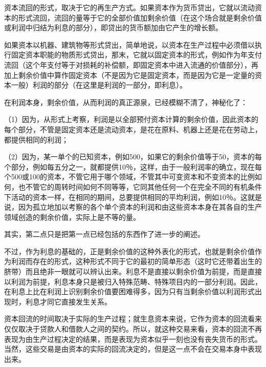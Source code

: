 资本流回的形式，取决于它的再生产方式。如果资本作为货币贷出，它就以流动资本的形式流回，流回的量等于它的全部价值加剩余价值（在这个场合就是剩余价值或利润中归结为利息的部分），即贷出的货币额加由它产生的增长额。

如果资本以机器、建筑物等形式贷出，简单地说，以资本在生产过程中必须借以执行固定资本职能的物质形式贷出，那末，它就以固定资本的形式，例如作为年支付流回（这个年支付等于对损耗的补偿额，即固定资本中进入流通的价值部分），再加上剩余价值中算作固定资本（不是因为它是固定资本，而是因为它是一定量的资本一般）利润的部分（在这里是利润的一部分，即利息）。

在利润本身，剩余价值，从而利润的真正源泉，已经模糊不清了，神秘化了：

（1）因为，从形式上考察，利润是以全部预付资本计算的剩余价值，因此资本的每个部分，不管是固定资本还是流动资本，是花在原料、机器上还是花在劳动上，都提供相同的利润；

（2）因为，某一单个的已知资本，例如500，如果它的剩余价值等于50，资本的每个部分，例如每五分之一，就都提供10％，这样，由于一般利润率的确立，现在每个500或100的资本，不管它用于哪个领域，不管其中可变资本和不变资本的比例如何，也不管它的周转时间如何不同等等，它同其他任何一个在完全不同的有机条件下活动的资本一样，在相同的期间，总要提供相同的平均利润，例如10％。这就是说，因为孤立地加以考察的各个单个资本的利润和由这些资本本身在其各自的生产领域创造的剩余价值，实际上是不等的量。

其实，第二点只是把第一点已经包括的东西作了进一步的阐述。

不过，作为利息的基础的，正是剩余价值的这种外表化的形式，也就是剩余价值作为利润而存在的形式，这种形式不同于它的最初的简单形态（这时它还带着出生的脐带）而且绝非一眼就可以辨认出来。利息不是直接以剩余价值为前提，而是直接以利润为前提，利息本身只是被归入特殊范畴、特殊项目内的一部分利润。因此，在利息上比在利润上识别剩余价值要困难得多，因为只有当剩余价值以利润形式出现时，利息才同它直接发生关系。

资本回流的时间取决于实际的生产过程；就生息资本来说，它作为资本的回流看来仅仅取决于贷款人和借款人之间的契约。所以，就这种交易来看，资本的回流不再表现为由生产过程决定的结果，而是表现为资本似乎一刻也没有丧失货币的形式。当然，这些交易是由资本的实际的回流决定的，但是这一点不会在交易本身中表现出来。

